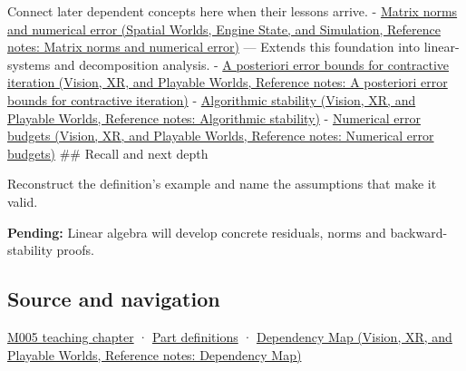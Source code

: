 \hypertarget{appendix-a7fbaf6d1b1c-used-by}{}

Connect later dependent concepts here when their lessons arrive. - \href{../05-Spatial-Worlds-Engine-State-and-Simulation/main.pdf\#nameddest=appendix-f8657bac66e5}{Matrix norms and numerical error (Spatial Worlds, Engine State, and Simulation, Reference notes: Matrix norms and numerical error)} --- Extends this foundation into linear-systems and decomposition analysis. - \href{../07-Vision-XR-and-Playable-Worlds/main.pdf\#nameddest=appendix-d83b0ad1be7f}{A posteriori error bounds for contractive iteration (Vision, XR, and Playable Worlds, Reference notes: A posteriori error bounds for contractive iteration)} - \href{../07-Vision-XR-and-Playable-Worlds/main.pdf\#nameddest=appendix-aa2bf0d79639}{Algorithmic stability (Vision, XR, and Playable Worlds, Reference notes: Algorithmic stability)} - \href{../07-Vision-XR-and-Playable-Worlds/main.pdf\#nameddest=appendix-31b8c295e05f}{Numerical error budgets (Vision, XR, and Playable Worlds, Reference notes: Numerical error budgets)} \#\# Recall and next depth

Reconstruct the definition's example and name the assumptions that make it valid.

\textbf{Pending:} Linear algebra will develop concrete residuals, norms and backward-stability proofs.

\subsection{Source and navigation}\label{appendix-a7fbaf6d1b1c-source-and-navigation}

\hypertarget{appendix-a7fbaf6d1b1c-source-and-navigation}{}

\hyperref[01-foundations-i-ch001-when-arithmetic-meets-uncertainty]{M005 teaching chapter} · \hyperref[appendix-fd090d982a15-m005---parts-77-88]{Part definitions} · \href{../07-Vision-XR-and-Playable-Worlds/main.pdf\#nameddest=appendix-4ad47bdd269a}{Dependency Map (Vision, XR, and Playable Worlds, Reference notes: Dependency Map)}
